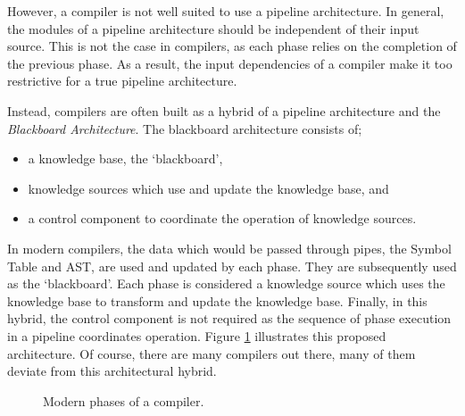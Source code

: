 \documentclass{csse4400}
\begin{document}
However, a compiler is not well suited to use a pipeline architecture.
In general, the modules of a pipeline architecture should be independent of their input source.
This is not the case in compilers, as each phase relies on the completion of the previous phase.
As a result, the input dependencies of a compiler make it too restrictive for a true pipeline architecture.

Instead, compilers are often built as a hybrid of a pipeline architecture and the \textsl{Blackboard Architecture}.
The blackboard architecture consists of;
\begin{itemize}
    \item a knowledge base, the `blackboard',
    \item knowledge sources which use and update the knowledge base, and
    \item a control component to coordinate the operation of knowledge sources.
\end{itemize}

In modern compilers, the data which would be passed through pipes, the Symbol Table and AST,
are used and updated by each phase.
They are subsequently used as the `blackboard'.
Each phase is considered a knowledge source which uses the knowledge base to transform and update the knowledge base.
Finally, in this hybrid, the control component is not required as the sequence of phase execution in a pipeline coordinates operation.
Figure \ref{fig:compiler-architecture-sym} illustrates this proposed architecture.
Of course, there are many compilers out there, many of them deviate from this architectural hybrid.

\begin{figure}[H]
    \centering
{}
\caption{Modern phases of a compiler.}
\label{fig:compiler-architecture-sym}
\end{figure}
\end{document}
